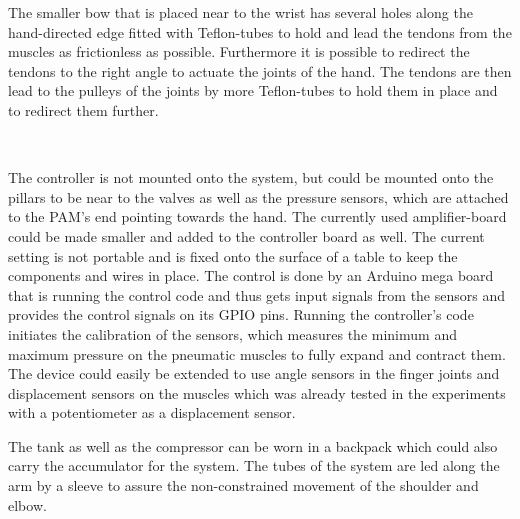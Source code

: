 \documentclass[main]{subfiles}
\begin{document}
 The smaller bow that is placed near to the wrist has several holes along the hand-directed edge fitted with Teflon-tubes to hold and lead the tendons from the muscles as frictionless as possible. Furthermore it is possible to redirect the tendons to the right angle to actuate the joints of the hand. The tendons are then lead to the pulleys of the joints by more Teflon-tubes to hold them in place and to redirect them further.

\begin{figure}[htp]
\centering
{}
\hspace{0.07\textwidth}
\\
\end{figure}

The controller is not mounted onto the system, but could be mounted onto the pillars to be near to the valves as well as the pressure sensors, which are attached to the PAM's end pointing towards the hand. The currently used amplifier-board could be made smaller and added to the controller board as well. The current setting is not portable and is fixed onto the surface of a table to keep the components and wires in place. The control is done by an Arduino mega board that is running the control code and thus gets input signals from the sensors and provides the control signals on its GPIO pins. Running the controller's code initiates the calibration of the sensors, which measures the minimum and maximum pressure on the pneumatic muscles to fully expand and contract them. The device could easily be extended to use angle sensors in the finger joints and displacement sensors on the muscles which was already tested in the experiments with a potentiometer as a displacement sensor.

The tank as well as the compressor can be worn in a backpack which could also carry the accumulator for the system. The tubes of the system are led along the arm by a sleeve to assure the non-constrained movement of the shoulder and elbow.
\end{document}
